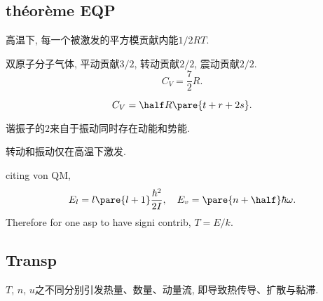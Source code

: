 \documentclass{ctexart}
\begin{document}
\subsection{\texorpdfstring{th\'eor\`eme EQP}{theorem EQP}} %
\label{sub:theoreme_EQP}

\begin{finale}
	高温下, 每一个被激发的平方模贡献内能$1/2RT$.
\end{finale}
\begin{ex}
	双原子分子气体, 平动贡献$3/2$, 转动贡献$2/2$, 震动贡献$2/2$.
	\[ C_V = \frac{7}{2}R. \]
\end{ex}
\begin{finale}
	\[ C_V = \half R\pare{t+r+2s}. \]
\end{finale}
\begin{pitfall}
	谐振子的$2$来自于振动同时存在动能和势能.
\end{pitfall}
\begin{pitfall}
	转动和振动仅在高温下激发.
\end{pitfall}
citing von QM,
\[ E_l = l\pare{l+1}\frac{\hbar^2}{2I},\quad E_v = \pare{n+\half}\hbar\omega. \]
Therefore for one asp to have signi contrib, $T = E/k$. 


\subsection{Transp} %
\label{sub:transp}

$T$, $n$, $u$之不同分别引发热量、数量、动量流, 即导致热传导、扩散与黏滞.

\end{document}
